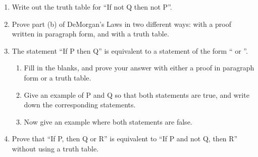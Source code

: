 \probsec{~\ref{sec:negat-logic-equiv}}
\begin{enumerate}
    \item Write out the truth table for ``If not Q then not P''.

    \item Prove part (b) of DeMorgan's Laws in two different ways: with a proof written in paragraph form, and with a truth table.


    \item The statement ``If P then Q'' is equivalent to a statement of the form ``\underline{\hspace{.5in}} or \underline{\hspace{.5in}}''.
  \begin{enumerate}
      \item Fill in the blanks, and prove your answer with either a proof in paragraph form or a truth table.
      \item Give an example of P and Q so that both statements are true, and write down the corresponding statements.
      \item Now give an example where both statements are false.
  \end{enumerate}

    \item Prove that ``If P, then Q or R'' is equivalent to ``If P and not Q, then R'' without using a truth table.


\end{enumerate}
